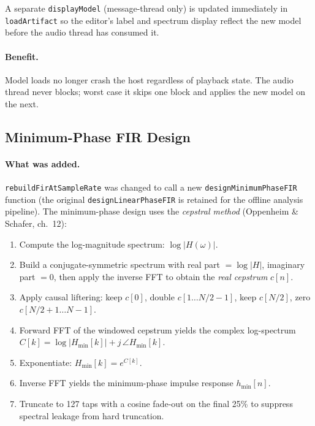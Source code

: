 \documentclass[11pt, letterpaper]{article}
\begin{document}
A separate \texttt{displayModel} (message-thread only) is updated immediately
in \texttt{loadArtifact} so the editor's label and spectrum display reflect the
new model before the audio thread has consumed it.

\paragraph{Benefit.}
Model loads no longer crash the host regardless of playback state.  The audio
thread never blocks; worst case it skips one block and applies the new model
on the next.

\subsection{Minimum-Phase FIR Design}

\paragraph{What was added.}
\texttt{rebuildFirAtSampleRate} was changed to call a new
\texttt{designMinimumPhaseFIR} function (the original
\texttt{designLinearPhaseFIR} is retained for the offline analysis pipeline).
The minimum-phase design uses the \emph{cepstral method}
(Oppenheim \& Schafer, ch.~12):

\begin{enumerate}[leftmargin=1.5em]
    \item Compute the log-magnitude spectrum:
          $\log |H(\omega)|$.
    \item Build a conjugate-symmetric spectrum with real part $= \log|H|$,
          imaginary part $= 0$, then apply the inverse FFT to obtain the
          \emph{real cepstrum} $c[n]$.
    \item Apply causal liftering: keep $c[0]$, double $c[1\ldots N/2-1]$,
          keep $c[N/2]$, zero $c[N/2+1\ldots N-1]$.
    \item Forward FFT of the windowed cepstrum yields the complex log-spectrum
          $C[k] = \log|H_\mathrm{min}[k]| + j\,\angle H_\mathrm{min}[k]$.
    \item Exponentiate: $H_\mathrm{min}[k] = e^{C[k]}$.
    \item Inverse FFT yields the minimum-phase impulse response $h_\mathrm{min}[n]$.
    \item Truncate to 127 taps with a cosine fade-out on the final 25\% to
          suppress spectral leakage from hard truncation.
\end{enumerate}
\end{document}
